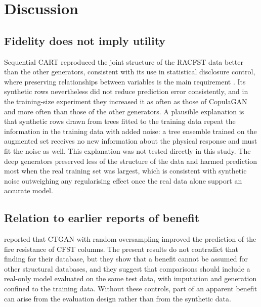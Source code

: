 \documentclass[pdflatex,sn-basic]{sn-jnl}
\begin{document}
\section{Discussion}\label{sec:discussion}

\subsection{Fidelity does not imply utility}
Sequential CART reproduced the joint structure of the RACFST data better than the other generators, consistent
with its use in statistical disclosure control, where preserving relationships between variables is the main
requirement \citep{nowok2016synthpop}. Its synthetic rows nevertheless did not reduce prediction error consistently, and in the
training-size experiment they increased it as often as those of CopulaGAN and more often than those of the
other generators. A
plausible explanation is that synthetic rows drawn from trees fitted to the training data repeat the information
in the training data with added noise: a tree ensemble trained on the augmented set receives no new information
about the physical response and must fit the noise as well. This explanation was not tested directly in this
study. The deep generators preserved less of the structure of the data and harmed prediction most when the real
training set was largest, which is consistent with synthetic noise outweighing any regularising effect once the
real data alone support an accurate model.

\subsection{Relation to earlier reports of benefit}
\citet{song2024fire} reported that CTGAN with random oversampling improved the prediction of the fire resistance
of CFST columns. The present results do not contradict that finding for their database, but they show that a
benefit cannot be assumed for other structural databases, and they suggest that comparisons should include a
real-only model evaluated on the same test data, with imputation and generation confined to the training data.
Without these controls, part of an apparent benefit can arise from the evaluation design rather than from the
synthetic data.
\end{document}
